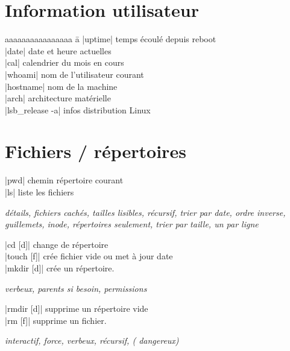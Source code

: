 \documentclass{article}
\newenvironment{cmdblock}{%
  \par\setlength{\parindent}{0pt}\setlength{\parskip}{0pt}%
  \RaggedRight%
}{\par}
\newlength{\cmdoptindent}
\newcommand{\cmdopt}[1]{%
  \hspace*{\cmdoptindent}%
  \begin{minipage}[t]{\dimexpr\linewidth-\cmdoptindent\relax}
    \RaggedRight \itshape #1%
  \end{minipage}\par
}
\begin{document}
\begin{multicols}{4}
    \section*{Information utilisateur}
    \begin{tabbing}
        aaaaaaaaaaaaaaaa \= a \kill
        \code|uptime| \> temps écoulé depuis reboot \\
        \code|date| \> date et heure actuelles \\
        \code|cal| \> calendrier du mois en cours \\
        \code|whoami| \> nom de l'utilisateur courant \\
        \code|hostname| \> nom de la machine \\
        \code|arch| \> architecture matérielle \\
        \code|lsb_release -a| \> infos distribution Linux
    \end{tabbing}

    \section*{Fichiers / répertoires}

    \begin{cmdblock}
        \code|pwd| \quad chemin répertoire courant \\
        \code|ls| \quad liste les fichiers \\
        \cmdopt{ détails,  fichiers cachés,
            \codx{-h} tailles lisibles, \codx{-R} récursif,
            \codx{-t} trier par date, \codx{-r} ordre inverse,
            \codx{-Q} guillemets, \codx{-i} inode,
            \codx{-d} répertoires seulement, \codx{-S} trier par taille,
            \codx{-1} un par ligne}
        \code|cd [d]| \quad change de répertoire \\
        \code|touch [f]| \quad crée fichier vide ou met à jour date \\
        \code|mkdir [d]| \quad crée un répertoire. \\
        \cmdopt{ verbeux,
         parents si besoin,
        \codx{-m [perms]} permissions}
        \code|rmdir [d]| \quad supprime un répertoire vide \\
        \code|rm [f]| \quad supprime un fichier. \\
        \cmdopt{ interactif,
             force,
            \codx{-v} verbeux,
            \codx{-r} récursif, (\codx{rm -rf} dangereux)}


\end{cmdblock}
\end{multicols}
\end{document}
